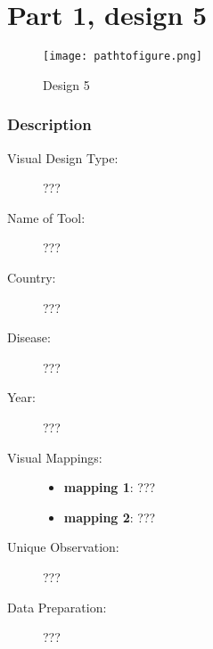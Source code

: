 \hypertarget{part-1-design-5}{%
\section{Part 1, design 5}\label{part-1-design-5}}

\begin{figure}
\centering
\texttt{[image: pathtofigure.png]}
\caption{Design 5}
\end{figure}

\hypertarget{description}{%
\subsubsection{Description}\label{description}}

\begin{description}
\item[Visual Design Type:]
???
\item[Name of Tool:]
???
\item[Country:]
???
\item[Disease:]
???
\item[Year:]
???
\item[Visual Mappings:]
\begin{itemize}
\tightlist
\item
  \textbf{mapping 1}: ???
\end{itemize}

\begin{itemize}
\tightlist
\item
  \textbf{mapping 2}: ???
\end{itemize}
\item[Unique Observation:]
???
\item[Data Preparation:]
???
\end{description}
